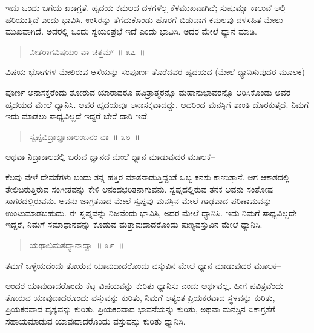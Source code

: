 ಇದು ಒಂದು ಬಗೆಯ ಏಕಾಗ್ರತೆ. ಹೃದಯ ಕಮಲದ ದಳಗಳೆಲ್ಲ ಕೆಳಮುಖವಾಗಿವೆ; ಸುಷುಮ್ನಾ ಕಾಲುವೆ ಅಲ್ಲಿ ಹರಿಯುತ್ತಿದೆ ಎಂದು ಭಾವಿಸಿ. ಉಸಿರನ್ನು ತೆಗೆದುಕೊಂಡು ಹೊರಗೆ ಬಿಡುವಾಗ ಕಮಲವು ದಳಸಹಿತ ಮೇಲು ಮುಖವಾಗಿದೆ. ಅದರಲ್ಲಿ ಒಂದು ಸ್ವಯಂಪ್ರಭೆ ಇದೆ ಎಂದು ಭಾವಿಸಿ. ಅದರ ಮೇಲೆ ಧ್ಯಾನ ಮಾಡಿ. 

\vspace{-0.2cm}

\begin{verse}
ವೀತರಾಗವಿಷಯಂ ವಾ ಚಿತ್ತಮ್​~॥ ೩೭~॥
\end{verse}

\vspace{-0.3cm}

ವಿಷಯ ಭೋಗಗಳ ಮೇಲಿರುವ ಆಸೆಯನ್ನು ಸಂಪೂರ್ಣ ತೊರೆದವರ ಹೃದಯದ (ಮೇಲೆ ಧ್ಯಾನಿಸುವುದರ ಮೂಲಕ)–

ಪೂರ್ಣ ಅನಾಸಕ್ತರೆಂದು ತೋರುವ ಯಾರಾದರೂ ಪವಿತ್ರಾತ್ಮರನ್ನೊ ಮಹಾನುಭಾವರನ್ನೊ ಆರಿಸಿಕೊಂಡು ಅವರ ಹೃದಯದ ಮೇಲೆ ಧ್ಯಾನಿಸಿ. ಅವರ ಹೃದಯವೂ ಅನಾಸಕ್ತವಾದದ್ದು. ಅದರಿಂದ ಮನಸ್ಸಿಗೆ ಶಾಂತಿ ದೊರಕುತ್ತದೆ. ನಿಮಗೆ ಇದು ಮಾಡಲು ಸಾಧ್ಯವಿಲ್ಲದೆ ಇದ್ದರೆ ಬೇರೆ ದಾರಿ ಇದೆ:

\vspace{-0.25cm}

\begin{verse}
ಸ್ವಪ್ನವಿದ್ರಾಜ್ಞಾನಾಲಂಬನಂ ವಾ~॥ ೩೮~॥
\end{verse}

\vspace{-0.2cm}

ಅಥವಾ ನಿದ್ರಾಕಾಲದಲ್ಲಿ ಬರುವ ಜ್ಞಾನದ ಮೇಲೆ ಧ್ಯಾನ ಮಾಡುವುದರ ಮೂಲಕ–

ಕೆಲವು ವೇಳೆ ದೇವತೆಗಳು ಬಂದು ತನ್ನ ಹತ್ತಿರ ಮಾತನಾಡುತ್ತಿದ್ದಂತೆ ಒಬ್ಬ ಕನಸು ಕಾಣುತ್ತಾನೆ. ಆಗ ಆಕಾಶದಲ್ಲಿ ತೇಲಿಬರುತ್ತಿರುವ ಸಂಗೀತವನ್ನು ಕೇಳಿ ಆನಂದಭರಿತನಾಗುವನು. ಸ್ವಪ್ನದಲ್ಲಿರುವ ತನಕ ಅವನು ಸಂತೋಷ ಸಾಗರದಲ್ಲಿರುವನು. ಅವನು ಜಾಗ್ರತನಾದ ಮೇಲೆ ಸ್ವಪ್ನವು ಮನಸ್ಸಿನ ಮೇಲೆ ಗಾಢವಾದ ಪರಿಣಾಮವನ್ನು ಉಂಟುಮಾಡಬಹುದು. ಈ ಸ್ವಪ್ನವನ್ನು ನಿಜವೆಂದು ಭಾವಿಸಿ, ಅದರ ಮೇಲೆ ಧ್ಯಾನಿಸಿ. ಇದು ನಿಮಗೆ ಸಾಧ್ಯವಿಲ್ಲದೇ ಇದ್ದರೆ, ನಿಮಗೆ ಸಮಾಧಾನವನ್ನು ಕೊಡುವ ಮತ್ತಾವುದಾದರೊಂದು ಪುಣ್ಯವಸ್ತುವಿನ ಮೇಲೆ ಧ್ಯಾನಿಸಿ. 

\vspace{-0.29cm}

\begin{verse}
ಯಥಾಭಿಮತಧ್ಯಾನಾದ್ವಾ~॥ ೩೯~॥
\end{verse}

\vspace{-0.3cm}

ತಮಗೆ ಒಳ್ಳೆಯದೆಂದು ತೋರುವ ಯಾವುದಾದರೊಂದು ವಸ್ತುವಿನ ಮೇಲೆ ಧ್ಯಾನ ಮಾಡುವುದರ ಮೂಲಕ–

ಅಂದರೆ ಯಾವುದಾದರೊಂದು ಕೆಟ್ಟ ವಿಷಯವನ್ನು ಕುರಿತು ಧ್ಯಾನಿಸು ಎಂದು ಅರ್ಥವಲ್ಲ. ಹೀಗೆ ಪವಿತ್ರವೆಂದು ತೋರುವ ಯಾವುದಾದರೊಂದು ವಸ್ತುವನ್ನು ಕುರಿತು, ನಿಮಗೆ ಅತ್ಯಂತ ಪ್ರಿಯಕರವಾದ ಸ್ಥಳವನ್ನು ಕುರಿತು, ಪ್ರಿಯಕರವಾದ ದೃಶ್ಯವನ್ನು ಕುರಿತು, ಪ್ರಿಯಕರವಾದ ಭಾವನೆಯನ್ನು ಕುರಿತು, ಅಥವಾ ಮನಸ್ಸಿನ ಏಕಾಗ್ರತೆಗೆ ಸಹಾಯಮಾಡುವ ಯಾವುದಾದರೊಂದು ವಸ್ತುವನ್ನು ಕುರಿತು ಧ್ಯಾನಿಸಿ. 

